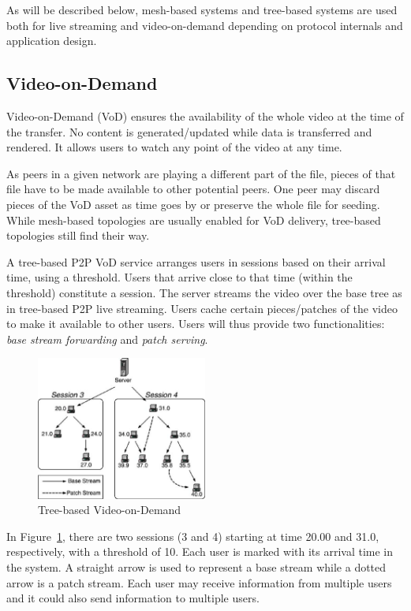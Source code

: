 As will be described below, mesh-based systems and tree-based systems are used
both for live streaming and video-on-demand depending on protocol internals
and application design.

\subsection{Video-on-Demand}
\label{subsec:p2p-systems:vod}

Video-on-Demand (VoD) ensures the availability of the whole video at the time
of the transfer. No content is generated/updated while data is transferred and
rendered. It allows users to watch any point of the video at any time.

As peers in a given network are playing a different part of the file, pieces
of that file have to be made available to other potential peers. One peer may
discard pieces of the VoD asset as time goes by or preserve the whole file for
seeding. While mesh-based topologies are usually enabled for VoD delivery,
tree-based topologies still find their way.

A tree-based P2P VoD service arranges users in sessions based on their arrival
time, using a threshold. Users that arrive close to that time (within the
threshold) constitute a session. The server streams the video over the base
tree as in tree-based P2P live streaming. Users cache certain pieces/patches
of the video to make it available to other users. Users will thus provide two
functionalities: \textit{base stream forwarding} and \textit{patch serving}.

\begin{figure}
  \centering
  \includegraphics[width=0.5\textwidth]{src/img/p2p-systems/tree-based-vod}
  \caption{Tree-based Video-on-Demand}
  \label{fig:p2p-systems:tree-based-vod}
\end{figure}

In Figure~\ref{fig:p2p-systems:tree-based-vod}, there are two sessions (3 and 4) starting
at time 20.00 and
31.0, respectively, with a threshold of 10. Each user is marked with its
arrival time in the system. A straight arrow is used to represent a base
stream while a dotted arrow is a patch stream. Each user may receive
information from multiple users and it could also send information to multiple
users.

